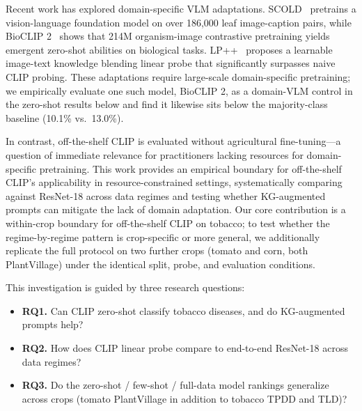 \documentclass[10pt,a4paper]{article}
\begin{document}
Recent work has explored domain-specific VLM adaptations. SCOLD~\cite{scold2025} pretrains a vision-language foundation model on over 186,000 leaf image-caption pairs, while BioCLIP 2~\cite{bioclip2} shows that 214M organism-image contrastive pretraining yields emergent zero-shot abilities on biological tasks. LP++~\cite{lpplus} proposes a learnable image-text knowledge blending linear probe that significantly surpasses naive CLIP probing. These adaptations require large-scale domain-specific pretraining; we empirically evaluate one such model, BioCLIP 2, as a domain-VLM control in the zero-shot results below and find it likewise sits below the majority-class baseline (10.1\% vs.\ 13.0\%).

In contrast, off-the-shelf CLIP is evaluated without agricultural fine-tuning---a question of immediate relevance for practitioners lacking resources for domain-specific pretraining. This work provides an empirical boundary for off-the-shelf CLIP's applicability in resource-constrained settings, systematically comparing against ResNet-18 across data regimes and testing whether KG-augmented prompts can mitigate the lack of domain adaptation. Our core contribution is a within-crop boundary for off-the-shelf CLIP on tobacco; to test whether the regime-by-regime pattern is crop-specific or more general, we additionally replicate the full protocol on two further crops (tomato and corn, both PlantVillage) under the identical split, probe, and evaluation conditions.

This investigation is guided by three research questions:

\begin{itemize}
    \item \textbf{RQ1.} Can CLIP zero-shot classify tobacco diseases, and do KG-augmented prompts help?
    \item \textbf{RQ2.} How does CLIP linear probe compare to end-to-end ResNet-18 across data regimes?
    \item \textbf{RQ3.} Do the zero-shot / few-shot / full-data model rankings generalize across crops (tomato PlantVillage in addition to tobacco TPDD and TLD)?
\end{itemize}
\end{document}

